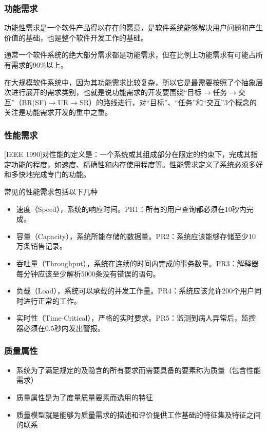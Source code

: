 \subsubsection{功能需求}
功能性需求是一个软件产品得以存在的愿意，是软件系统能够解决用户问题和产生价值的基础，也是整个软件开发工作的基础。

通常一个软件系统的绝大部分需求都是功能需求，但在比例上功能需求有可能占所有需求的90\%以上。

在大规模软件系统中，因为其功能需求比较复杂，所以它是最需要按照了个抽象层次进行展开的需求类别，也就是说功能需求的开发要围绕“目标$\rightarrow$任务$\rightarrow$交互”（BR(SF)$\rightarrow$UR$\rightarrow$SR）的路线进行，对“目标”、“任务”和“交互”3个概念的关注是功能需求开发的重中之重。

\subsubsection{性能需求}
[IEEE 1990]对性能的定义是：一个系统或其组成部分在限定的约束下，完成其指定功能的程度，如速度、精确性和内存使用程度等。性能需求定义了系统必须多好和多快地完成专门的功能。

常见的性能需求包括以下几种
\begin{itemize}
    \item 速度（Speed），系统的响应时间。PR1：所有的用户查询都必须在10秒内完成。
    \item 容量（Capacity），系统所能存储的数据量。PR2：系统应该能够存储至少10万条销售记录。
    \item 吞吐量（Throughput），系统在连续的时间内完成的事务数量。PR3：解释器每分钟应该至少解析5000条没有错误的语句。
    \item 负载（Load），系统可以承载的并发工作量。PR4：系统应该允许200个用户同时进行正常的工作。
    \item 实时性（Time-Critical），严格的实时要求。PR5：监测到病人异常后，监控器必须在0.5秒内发出警报。
\end{itemize}

\subsubsection{质量属性}
\begin{itemize}
    \item 系统为了满足规定的及隐含的所有要求而需要具备的要素称为质量（包含性能需求） 
    \item 质量属性是为了度量质量要素而选用的特征 
    \item 质量模型就是能够为质量需求的描述和评价提供工作基础的特征集及特征之间的联系 
\end{itemize}

